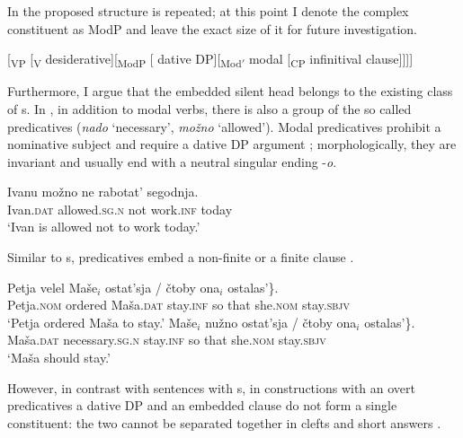 \documentclass[output=paper,colorlinks,citecolor=brown,newtxmath]{langsci/langscibook}
\begin{document}
\noindent In  the proposed structure is repeated; at this point I denote the complex  constituent as ModP and leave the exact size of it for future investigation.

\ea\label{ex19}
{[\textsubscript{VP} [\textsubscript{V} desiderative][\textsubscript{ModP} [\hspace{-2pt} dative DP][\textsubscript{Mod$'$} modal [\textsubscript{CP} infinitival clause]]]]}
\z

\noindent Furthermore, I argue that the embedded silent head belongs to the existing class of s. In , in addition to modal verbs, there is also a group of the so called  predicatives (\textit{nado} `necessary’, \textit{možno} `allowed’). Modal predicatives prohibit a nominative subject and require a dative DP argument ; morphologically, they are invariant and usually end with a neutral singular ending -\textit{o}.

\ea\label{ex20}
\gll Ivanu možno ne rabotat’ segodnja.\\
    Ivan.\textsc{dat} allowed.\textsc{sg.n} not work.\textsc{inf} today\\
\glt `Ivan is allowed not to work today.'
\z

\noindent Similar to s,  predicatives embed a non-finite or a finite  clause .

\ea\label{ex21}
\ea\label{ex21a}
\gll Petja velel Maše$_i$ \minsp{\{} ostat’sja / čtoby ona$_i$ ostalas’\}.\\
    Petja.\textsc{nom} ordered Maša.\textsc{dat} {} stay.\textsc{inf} {} {so that} she.\textsc{nom} stay.\textsc{sbjv}\\
\glt `Petja ordered Maša to stay.'
\ex\label{ex21b}
\gll Maše$_i$ nužno \minsp{\{} ostat’sja / čtoby ona$_i$ ostalas’\}.\\
    Maša.\textsc{dat} necessary.\textsc{sg.n} {} stay.\textsc{inf} {} {so that} she.\textsc{nom} stay.\textsc{sbjv}\\
\glt `Maša should stay.'
\z
\z

\noindent However, in contrast with sentences with s, in constructions with an overt  predicatives a dative DP and an embedded clause do not form a single constituent: the two cannot be separated together in clefts  and short answers .

\z
\end{document}
